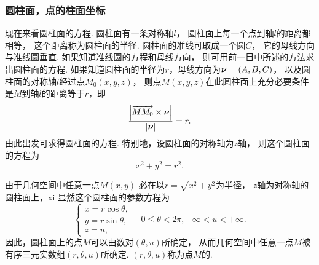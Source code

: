 \subsubsection{圆柱面，点的柱面坐标}
现在来看圆柱面的方程.
圆柱面有一条对称轴\(l\)，
圆柱面上每一个点到轴\(l\)的距离都相等，
这个距离称为圆柱面的半径.
圆柱面的准线可取成一个圆\(C\)，
它的母线方向与准线圆垂直.
如果知道准线圆的方程和母线方向，
则可用前一目中所述的方法求出圆柱面的方程.
如果知道圆柱面的半径为\(r\)，母线方向为\(\boldsymbol{\nu}=(A,B,C)\)，
以及圆柱面的对称轴\(l\)经过点\(M_0(x,y,z)\)，
则点\(M(x,y,z)\)在此圆柱面上充分必要条件是\(M\)到轴\(l\)的距离等于\(r\)，即\[
	\frac{\abs{\overrightarrow{M M_0} \times \boldsymbol{\nu}}}{\abs{\boldsymbol{\nu}}} = r.
\]
由此出发可求得圆柱面的方程.
特别地，设圆柱面的对称轴为\(z\)轴，
则这个圆柱面的方程为
\begin{equation}\label{equation:解析几何.以z轴为对称轴r为半径的圆柱面的一般方程}
	x^2+y^2=r^2.
\end{equation}

由于几何空间中任意一点\(M(x,y)\)
必在以\(r=\sqrt{x^2+y^2}\)为半径，
\(z\)轴为对称轴的圆柱面上，xi
显然这个圆柱面的参数方程为\[
	\left\{ \begin{array}{l}
		x = r \cos\theta, \\
		y = r \sin\theta, \\
		z = u,
	\end{array} \right.
	\quad 0\leq \theta < 2\pi,
	-\infty < u < +\infty.
\]
因此，圆柱面上的点\(M\)可以由数对\((\theta,u)\)所确定，
从而几何空间中任意一点\(M\)被有序三元实数组\((r,\theta,u)\)所确定.
\((r,\theta,u)\)称为点\(M\)的.


